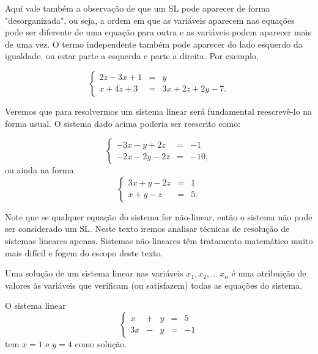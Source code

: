 \begin{ex}
Aqui vale também a observação de que um SL pode aparecer de forma "desorganizada", ou seja, a ordem em que as variáveis aparecem nas equações pode ser diferente de uma equação para outra e as variáveis podem aparecer mais de uma vez. O termo independente também pode aparecer do lado esquerdo da igualdade, ou estar parte a esquerda e parte a direita.
Por exemplo,

\begin{equation*}
\left\{
\begin{array}{ccc}
2z-3x+1 & = &y \\
x+4z+3& = & 3x+2z+2y-7.
\end{array}
\right.
\end{equation*}

Veremos que para resolvermos um sistema linear será fundamental reescrevê-lo na forma usual. O sistema dado acima poderia ser reescrito como:

\begin{equation*}
\left\{
\begin{array}{ccc}
-3x-y+2z & = & -1 \\
-2x-2y-2z & = & -10,
\end{array}
\right.
\end{equation*}
ou ainda na forma
\begin{equation*}
\left\{
\begin{array}{ccc}
3x+y-2z & = & 1 \\
x+y-z & = & 5.
\end{array}
\right.
\end{equation*}
\end{ex}

Note que se qualquer equação do sistema for não-linear, então o sistema não pode ser considerado um SL.
Neste texto iremos analisar técnicas de resolução de sistemas lineares apenas. Sistemas não-lineares têm tratamento matemático muito mais difícil e fogem do escopo deste texto.


\bigskip

\begin{defn}  Uma solução de um sistema linear nas variáveis $x_1, x_2 , \hdots \ x_n$
é uma %
atribuição de valores
às variáveis que verificam (ou satisfazem) todas as equações do sistema.
\end{defn}

\begin{ex}
O sistema linear
\begin{equation*}
\left\{
\begin{array}{ccccc}
x&+&y&=&5 \\
3x&-&y&=&-1
\end{array}
\right.
\end{equation*}
tem $x=1$ e $y=4$ como solução.

\end{ex}

